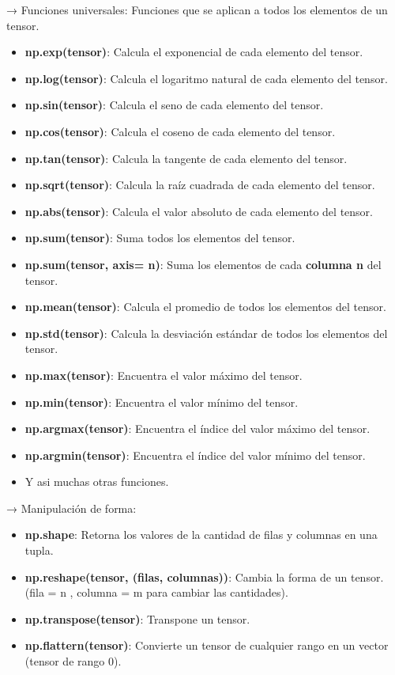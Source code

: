 \documentclass{templateNote}
\begin{document}
 → Funciones universales: Funciones que se aplican a todos los elementos de un tensor.
\begin{itemize}
    \item \textbf{np.exp(tensor)}: Calcula el exponencial de cada elemento del tensor.
    \item \textbf{np.log(tensor)}: Calcula el logaritmo natural de cada elemento del tensor.
    \item \textbf{np.sin(tensor)}: Calcula el seno de cada elemento del tensor.
    \item \textbf{np.cos(tensor)}: Calcula el coseno de cada elemento del tensor.
    \item \textbf{np.tan(tensor)}: Calcula la tangente de cada elemento del tensor.
    \item \textbf{np.sqrt(tensor)}: Calcula la raíz cuadrada de cada elemento del tensor.
    \item \textbf{np.abs(tensor)}: Calcula el valor absoluto de cada elemento del tensor.
    \item \textbf{np.sum(tensor)}: Suma todos los elementos del tensor.
    \item \textbf{np.sum(tensor, axis= n)}: Suma los elementos de cada \textbf{columna n} del tensor.
    \item \textbf{np.mean(tensor)}: Calcula el promedio de todos los elementos del tensor.
    \item \textbf{np.std(tensor)}: Calcula la desviación estándar de todos los elementos del tensor.
    \item \textbf{np.max(tensor)}: Encuentra el valor máximo del tensor.
    \item \textbf{np.min(tensor)}: Encuentra el valor mínimo del tensor.
    \item \textbf{np.argmax(tensor)}: Encuentra el índice del valor máximo del tensor.
    \item \textbf{np.argmin(tensor)}: Encuentra el índice del valor mínimo del tensor.
    \item Y asi muchas otras funciones.
\end{itemize}

 → Manipulación de forma: 
\begin{itemize}
    \item \textbf{np.shape}: Retorna los valores de la cantidad de filas y columnas en una tupla.
    \item \textbf{np.reshape(tensor, (filas, columnas))}: Cambia la forma de un tensor. (fila = n , columna = m para cambiar las cantidades).
    \item \textbf{np.transpose(tensor)}: Transpone un tensor.
    \item \textbf{np.flattern(tensor)}: Convierte un tensor de cualquier rango en un vector (tensor de rango 0).
\end{itemize}
\end{document}
